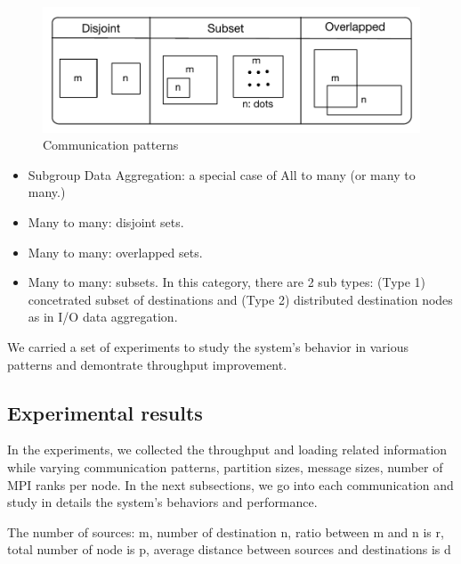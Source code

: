 \begin{figure}[ht]
\vspace{-0.1in}
\centering
\includegraphics[scale=0.55]{figures/patterns.pdf}
\vspace{-0.1in}
\caption{Communication patterns}
\vspace{-0.1in}
\label{fig:patterns}
\end{figure}

\begin{itemize}
\item Subgroup Data Aggregation: a special case of All to many (or many to many.)
\item Many to many: disjoint sets.
\item Many to many: overlapped sets.
\item Many to many: subsets. In this category, there are 2 sub types: (Type 1) concetrated subset of destinations and (Type 2) distributed destination nodes as in I/O data aggregation.
\end{itemize}

We carried a set of experiments to study the system's behavior in various patterns and demontrate throughput improvement.

\subsection{Experimental results}

In the experiments, we collected the throughput and loading related information while varying communication patterns, partition sizes, message sizes, number of MPI ranks per node.
In the next subsections, we go into each communication and study in details the system's behaviors and performance.

The number of sources: m, number of destination n, ratio between m and n is r, total number of node is p, average distance between sources and destinations is d

